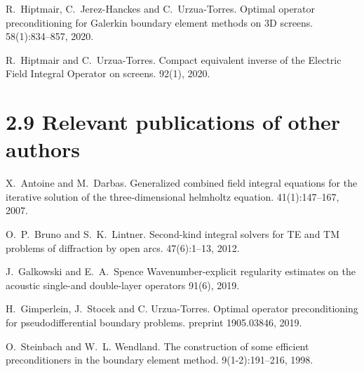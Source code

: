 \documentclass[]{article}
\begin{document}
\begin{thebibliography}{0}
	R.~Hiptmair, C.~Jerez-Hanckes and C.~Urzua-Torres.
	\newblock Optimal operator preconditioning for Galerkin boundary element methods on 3D screens. 
	 58(1):834--857, 2020.
	
	R.~Hiptmair and C.~Urzua-Torres.
	\newblock Compact equivalent inverse of the {E}lectric {F}ield
	{I}ntegral {O}perator on screens.
	 92(1), 2020.
	
\end{thebibliography}


\section*{2.9 Relevant publications of other authors}


\begin{thebibliography}{0}
	X.~Antoine and M.~Darbas.
	\newblock Generalized combined field integral equations for the iterative
	solution of the three-dimensional helmholtz equation.
	41(1):147--167, 2007.
	
	O.~P.~Bruno and S.~K.~Lintner.
	\newblock Second-kind integral solvers for TE and TM problems of diffraction by open arcs.
	 47(6):1--13, 2012.
	
	J.~Galkowski and E.~A.~Spence
	\newblock Wavenumber-explicit regularity estimates on the acoustic single-and double-layer operators
	91(6), 2019.
	
	H.~Gimperlein, J.~Stocek and C. Urzua-Torres.
	\newblock Optimal operator preconditioning for pseudodifferential boundary problems.
	 preprint 1905.03846, 2019.
	
	O.~Steinbach and W.~L. Wendland.
	\newblock The construction of some efficient preconditioners in the boundary
	element method.
	 9(1-2):191--216, 1998.	
\end{thebibliography}
\end{document}

